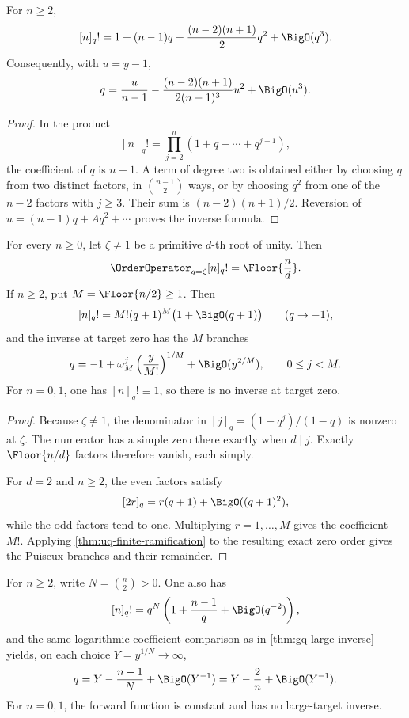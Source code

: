 \begin{proposition}
\label{prop:qs-qfactorial-zero}
For \(n\ge2\),
\[
  [n]_q!
  =1+(n-1)q+\frac{(n-2)(n+1)}2q^2+\BigO(q^3).
\]
Consequently, with \(u=y-1\),
\[
  q=\frac{u}{n-1}
   -\frac{(n-2)(n+1)}{2(n-1)^3}u^2+\BigO(u^3).
\]
\end{proposition}

\begin{proof}
In the product
\[
  [n]_q!=\prod_{j=2}^{n}(1+q+\cdots+q^{j-1}),
\]
the coefficient of \(q\) is \(n-1\).  A term of degree two is obtained
either by choosing \(q\) from two distinct factors, in
\(\binom{n-1}{2}\) ways, or by choosing \(q^2\) from one of the
\(n-2\) factors with \(j\ge3\).  Their sum is
\((n-2)(n+1)/2\).  Reversion of
\(u=(n-1)q+Aq^2+\cdots\) proves the inverse formula.
\end{proof}

\begin{theorem}
\label{thm:qs-qfactorial-root}
For every \(n\ge0\), let \(\zeta\ne1\) be a primitive \(d\)-th root of
unity.  Then
\[
  \OrderOperator_{q=\zeta}[n]_q!
  =\Floor{\frac nd}.
\]
If \(n\ge2\), put \(M=\Floor{n/2}\ge1\).  Then
\[
  [n]_q!=M!(q+1)^M\bigl(1+\BigO(q+1)\bigr)
  \qquad(q\to-1),
\]
and the inverse at target zero has the \(M\) branches
\[
  q=-1+\omega_M^j\left(\frac{y}{M!}\right)^{1/M}
    +\BigO(y^{2/M}),
  \qquad 0\le j<M.
\]
For \(n=0,1\), one has \([n]_q!\equiv1\), so there is no inverse at target
zero.
\end{theorem}

\begin{proof}
Because \(\zeta\ne1\), the denominator in
\([j]_q=(1-q^j)/(1-q)\) is nonzero at \(\zeta\).  The numerator has a
simple zero there exactly when \(d\mid j\).  Exactly
\(\Floor{n/d}\) factors therefore vanish, each simply.

For \(d=2\) and \(n\ge2\), the even factors satisfy
\[
  [2r]_q=r(q+1)+\BigO((q+1)^2),
\]
while the odd factors tend to one.  Multiplying \(r=1,\ldots,M\) gives the
coefficient \(M!\).  Applying
\cref{thm:uq-finite-ramification} to the resulting exact zero order gives the
Puiseux branches and their remainder.
\end{proof}

For \(n\ge2\), write \(N=\binom n2>0\).  One also has
\[
  [n]_q!=q^N\left(1+\frac{n-1}{q}+\BigO(q^{-2})\right),
\]
and the same logarithmic coefficient comparison as in
\cref{thm:gq-large-inverse} yields, on each choice
\(Y=y^{1/N}\to\infty\),
\[
  q=Y-\frac{n-1}{N}+\BigO(Y^{-1})
   =Y-\frac2n+\BigO(Y^{-1}).
\]
For \(n=0,1\), the forward function is constant and has no large-target
inverse.

